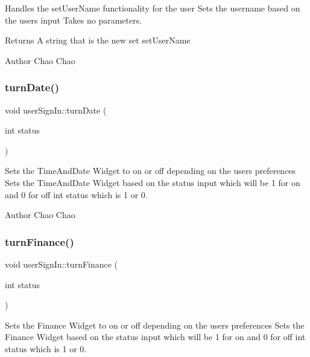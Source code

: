 Handles the set\+User\+Name functionality for the user  Sets the username based on the user\textquotesingle{}s input  Takes no parameters. 

\begin{DoxyReturn}{Returns}
A string that is the new set set\+User\+Name 
\end{DoxyReturn}
\begin{DoxyAuthor}{Author}
Chao Chao 
\end{DoxyAuthor}
\mbox{\label{classuser_sign_in_a3d0909776d239ff774fd4134e6bd43ad}} 
\subsubsection{\texorpdfstring{turn\+Date()}{turnDate()}}
{\footnotesize\ttfamily void user\+Sign\+In\+::turn\+Date (\begin{DoxyParamCaption}\item[{int}]{status }\end{DoxyParamCaption})}



Sets the Time\+And\+Date Widget to on or off depending on the user\textquotesingle{}s preferences  Sets the Time\+And\+Date Widget based on the status input which will be 1 for on and 0 for off  int status which is 1 or 0. 

\begin{DoxyAuthor}{Author}
Chao Chao 
\end{DoxyAuthor}
\mbox{\label{classuser_sign_in_a0a8353698be1f010c3365b119c6c6ed6}} 
\subsubsection{\texorpdfstring{turn\+Finance()}{turnFinance()}}
{\footnotesize\ttfamily void user\+Sign\+In\+::turn\+Finance (\begin{DoxyParamCaption}\item[{int}]{status }\end{DoxyParamCaption})}



Sets the Finance Widget to on or off depending on the user\textquotesingle{}s preferences  Sets the Finance Widget based on the status input which will be 1 for on and 0 for off  int status which is 1 or 0. 

